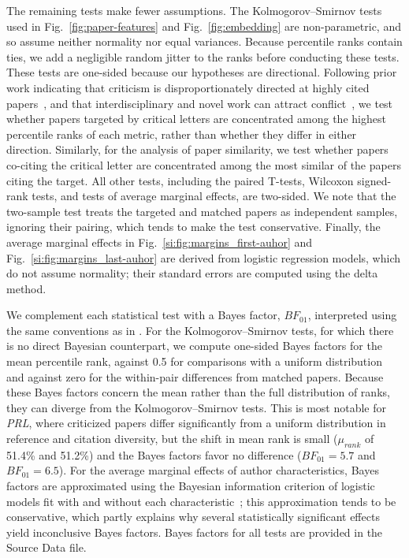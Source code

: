 \documentclass[12pt]{article} %
\begin{document}
The remaining tests make fewer assumptions.
The Kolmogorov–Smirnov tests used in Fig.~\ref*{fig:paper-features} and Fig.~\ref*{fig:embedding} are non-parametric, and so assume neither normality nor equal variances.
Because percentile ranks contain ties, we add a negligible random jitter to the ranks before conducting these tests.
These tests are one-sided because our hypotheses are directional.
Following prior work indicating that criticism is disproportionately directed at highly cited papers~\cite{radicchi_2012_comment,catalini_2015_negative}, and that interdisciplinary and novel work can attract conflict~\cite{mcleish_2016_interdisciplinary,boudreau_2016_looking}, we test whether papers targeted by critical letters are concentrated among the highest percentile ranks of each metric, rather than whether they differ in either direction.
Similarly, for the analysis of paper similarity, we test whether papers co-citing the critical letter are concentrated among the most similar of the papers citing the target.
All other tests, including the paired T-tests, Wilcoxon signed-rank tests, and tests of average marginal effects, are two-sided.
We note that the two-sample test treats the targeted and matched papers as independent samples, ignoring their pairing, which tends to make the test conservative.
Finally, the average marginal effects in Fig.~\ref{si:fig:margins_first-auhor} and Fig.~\ref{si:fig:margins_last-auhor} are derived from logistic regression models, which do not assume normality; their standard errors are computed using the delta method.

We complement each statistical test with a Bayes factor, $BF_{01}$, interpreted using the same conventions as in .
For the Kolmogorov–Smirnov tests, for which there is no direct Bayesian counterpart, we compute one-sided Bayes factors for the mean percentile rank, against 0.5 for comparisons with a uniform distribution and against zero for the within-pair differences from matched papers.
Because these Bayes factors concern the mean rather than the full distribution of ranks, they can diverge from the Kolmogorov–Smirnov tests.
This is most notable for \textit{PRL}, where criticized papers differ significantly from a uniform distribution in reference and citation diversity, but the shift in mean rank is small ($\mu_{rank}$ of 51.4\% and 51.2\%) and the Bayes factors favor no difference ($BF_{01} = 5.7$ and $BF_{01} = 6.5$).
For the average marginal effects of author characteristics, Bayes factors are approximated using the Bayesian information criterion of logistic models fit with and without each characteristic~\cite{wagenmakers2007practical}; this approximation tends to be conservative, which partly explains why several statistically significant effects yield inconclusive Bayes factors.
Bayes factors for all tests are provided in the Source Data file.
\end{document}
